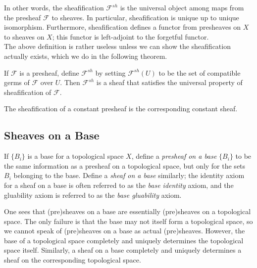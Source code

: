 \documentclass[11pt,openany]{book} %
\begin{document}
In other words, the sheafification $\mathcal{F}^{sh}$ is the universal object among maps from the presheaf $\mathcal{F}$ to sheaves. In particular, sheafification is unique up to unique isomorphism. Furthermore, sheafification defines a functor from presheaves on $X$ to sheaves on $X$; this functor is left-adjoint to the forgetful functor.\\

The above definition is rather useless unless we can show the sheafification actually exists, which we do in the following theorem.\\

\begin{theorem} \label{sheafification}
If $\mathcal{F}$ is a presheaf, define $\mathcal{F}^{sh}$ by setting $\mathcal{F}^{sh}(U)$ to be the set of compatible germs of $\mathcal{F}$ over $U$.
Then $\mathcal{F}^{sh}$ is a sheaf that satisfies the universal property of sheafification of $\mathcal{F}$.
\end{theorem}

\begin{example}
The sheafification of a constant presheaf is the corresponding constant sheaf.
\end{example}


\subsection{Sheaves on a Base}

\medskip
\begin{definition}
If $\{B_i\}$ is a base for a topological space $X$, define a \emph{presheaf on a base} $\{B_i\}$ to be the same information as a presheaf on a topological space, but only for the sets $B_i$ belonging to the base. Define a \emph{sheaf on a base} similarly; the identity axiom for a sheaf on a base is often referred to as the \emph{base identity} axiom, and the gluability axiom is referred to as the \emph{base gluability} axiom.
\end{definition}

One sees that (pre)sheaves on a base are essentially (pre)sheaves on a topological space. The only failure is that the base may not itself form a topological space, so we cannot speak of (pre)sheaves on a base as actual (pre)sheaves. However, the base of a topological space completely and uniquely determines the topological space itself. Similarly, a sheaf on a base completely and uniquely determines a sheaf on the corresponding topological space.\\
\end{document}
